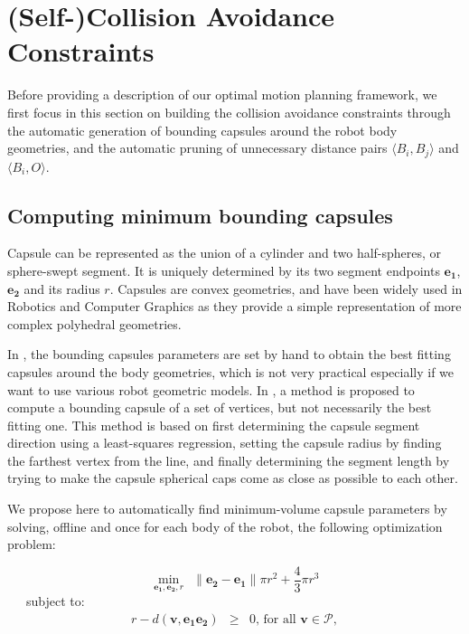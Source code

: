 \section{(Self-)Collision Avoidance Constraints}
\label{distance-constraints}

Before providing a description of our optimal motion planning
framework, we first focus in this section on building the collision
avoidance constraints through the automatic generation of bounding
capsules around the robot body geometries, and the automatic pruning
of unnecessary distance pairs $\langle B_i,B_j\rangle$ and $\langle
B_i,O\rangle$.

\subsection{Computing minimum bounding capsules}

Capsule can be represented as the union of a cylinder and two
half-spheres, or sphere-swept segment. It is uniquely determined by
its two segment endpoints $\mathbf{e_1}$, $\mathbf{e_2}$ and its
radius $r$. Capsules are convex geometries, and have been widely used
in Robotics and Computer Graphics as they provide a simple
representation of more complex polyhedral geometries.

In \cite{Kanoun2011}, the bounding capsules parameters are set by hand
to obtain the best fitting capsules around the body geometries, which
is not very practical especially if we want to use various robot
geometric models. In \cite{eberly20073d}, a method is proposed to
compute a bounding capsule of a set of vertices, but not necessarily
the best fitting one. This method is based on first determining the
capsule segment direction using a least-squares regression, setting
the capsule radius by finding the farthest vertex from the line, and
finally determining the segment length by trying to make the capsule
spherical caps come as close as possible to each other.

We propose here to automatically find minimum-volume capsule
parameters by solving, offline and once for each body of the robot,
the following optimization problem:

\begin{equation}
  \min_{\mathbf{e_1}, \mathbf{e_2}, r} \ \ 
  \|\mathbf{e_2} - \mathbf{e_1}\| \pi r^2 + \frac{4}{3}\pi r^3
  \label{capsule-objective}
\end{equation}
\ \ \ subject to:
\begin{equation}
  \begin{array}{rcll}
    r - d(\mathbf{\mathbf{v}},\mathbf{e_1e_2}) & \ge & 0\mbox{, for all }
    \mathbf{v} \in \mathcal{P},
    \label{capsule-constraint}
  \end{array}
\end{equation} 

